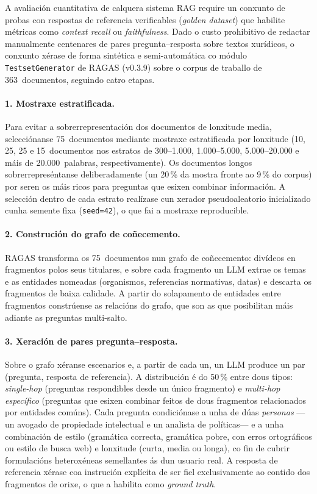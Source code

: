 \documentclass[11pt, a4paper, oneside]{report}
\begin{document}
A avaliación cuantitativa de calquera sistema RAG require un conxunto de probas
con respostas de referencia verificables (\textit{golden dataset}) que habilite
métricas como \textit{context recall} ou \textit{faithfulness}. Dado o custo
prohibitivo de redactar manualmente centenares de pares pregunta--resposta sobre
textos xurídicos, o conxunto xérase de forma sintética e semi-automática co módulo
\texttt{TestsetGenerator} de RAGAS (v0.3.9) sobre o corpus de traballo de
363~documentos, seguindo catro etapas.

\paragraph{1. Mostraxe estratificada.} Para evitar a sobrerrepresentación dos
documentos de lonxitude media, selecciónanse 75~documentos mediante mostraxe
estratificada por lonxitude (10, 25, 25 e 15~documentos nos estratos de 300--1.000,
1.000--5.000, 5.000--20.000 e máis de 20.000~palabras, respectivamente). Os
documentos longos sobrerrepreséntanse deliberadamente (un 20\,\% da mostra fronte
ao 9\,\% do corpus) por seren os máis ricos para preguntas que esixen combinar
información. A selección dentro de cada estrato realízase cun xerador pseudoaleatorio
inicializado cunha semente fixa (\texttt{seed=42}), o que fai a mostraxe reproducible.

\paragraph{2. Construción do grafo de coñecemento.} RAGAS transforma os
75~documentos nun grafo de coñecemento: divídeos en fragmentos polos seus titulares,
e sobre cada fragmento un LLM extrae os temas e as entidades nomeadas (organismos,
referencias normativas, datas) e descarta os fragmentos de baixa calidade. A partir
do solapamento de entidades entre fragmentos constrúense as relacións do grafo, que
son as que posibilitan máis adiante as preguntas multi-salto.

\paragraph{3. Xeración de pares pregunta--resposta.} Sobre o grafo xéranse escenarios
e, a partir de cada un, un LLM produce un par (pregunta, resposta de referencia). A
distribución é do 50\,\% entre dous tipos: \textit{single-hop} (preguntas
respondibles desde un único fragmento) e \textit{multi-hop específico} (preguntas que
esixen combinar feitos de dous fragmentos relacionados por entidades comúns). Cada
pregunta condiciónase a unha de dúas \textit{personas} —un avogado de propiedade
intelectual e un analista de políticas— e a unha combinación de estilo (gramática
correcta, gramática pobre, con erros ortográficos ou estilo de busca web) e lonxitude
(curta, media ou longa), co fin de cubrir formulacións heteroxéneas semellantes ás
dun usuario real. A resposta de referencia xérase coa instrución explícita de ser
fiel exclusivamente ao contido dos fragmentos de orixe, o que a habilita como
\textit{ground truth}.
\end{document}
